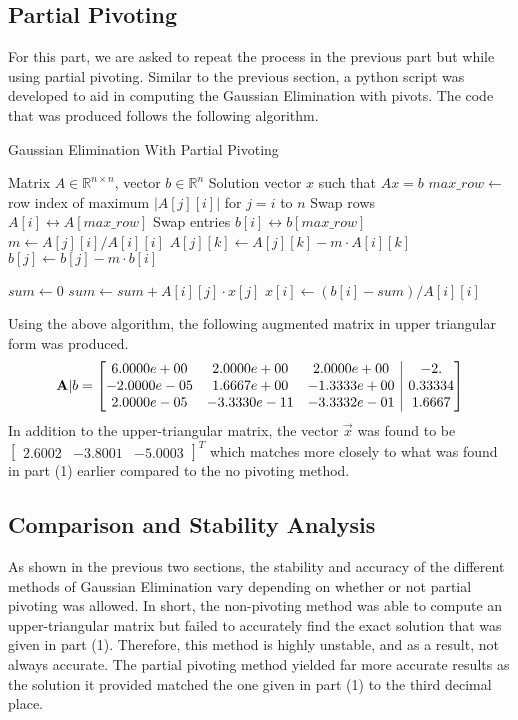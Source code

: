 \documentclass{article}
\begin{document}
\subsection{Partial Pivoting}
For this part, we are asked to repeat the process in the previous part but while using partial pivoting. Similar to the previous section, a python script was developed to aid in computing the Gaussian Elimination with pivots. The code that was produced follows the following algorithm.
\begin{algorithm}
\caption{Gaussian Elimination With Partial Pivoting}
\begin{algorithmic}[1]
\Require Matrix $A \in \mathbb{R}^{n \times n}$, vector $b \in \mathbb{R}^n$
\Ensure Solution vector $x$ such that $Ax = b$
    \State $max\_row \gets$ row index of maximum $|A[j][i]|$ for $j = i$ to $n$
        \State Swap rows $A[i] \leftrightarrow A[max\_row]$
        \State Swap entries $b[i] \leftrightarrow b[max\_row]$
    \EndIf
        \State $m \gets A[j][i] / A[i][i]$
            \State $A[j][k] \gets A[j][k] - m \cdot A[i][k]$
        \EndFor
        \State $b[j] \gets b[j] - m \cdot b[i]$
    \EndFor
\EndFor

\State {}
    \State $sum \gets 0$
        \State $sum \gets sum + A[i][j] \cdot x[j]$
    \EndFor
    \State $x[i] \gets (b[i] - sum) / A[i][i]$
\EndFor
\end{algorithmic}
\end{algorithm}
Using the above algorithm, the following augmented matrix in upper triangular form was produced.
\[
\mathbf{A}|b = \left[\begin{array}{@{}ccc|c@{}}
6.0000e+00 & 2.0000e+00 & 2.0000e+00 & -2. \\
-2.0000e-05 & 1.6667e+00 & -1.3333e+00 & 0.33334 \\
2.0000e-05 & -3.3330e-11 & -3.3332e-01 & 1.6667
\end{array}\right]
\]
In addition to the upper-triangular matrix, the vector \(\Vec{x}\) was found to be \(\begin{bmatrix}
    2.6002 & -3.8001 & -5.0003
\end{bmatrix}^T\) which matches more closely to what was found in part (1) earlier compared to the no pivoting method.

\subsection{Comparison and Stability Analysis}
As shown in the previous two sections, the stability and accuracy of the different methods of Gaussian Elimination vary depending on whether or not partial pivoting was allowed. In short, the non-pivoting method was able to compute an upper-triangular matrix but failed to accurately find the exact solution that was given in part (1). Therefore, this method is highly unstable, and as a result, not always accurate. The partial pivoting method yielded far more accurate results as the solution it provided matched the one given in part (1) to the third decimal place.
\end{document}
